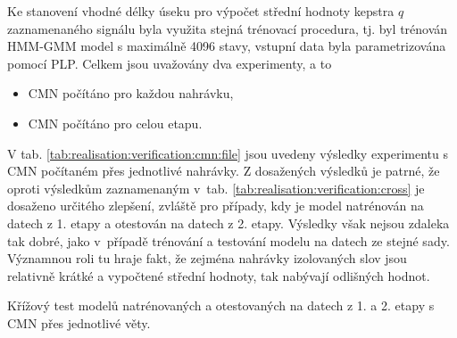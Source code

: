 Ke stanovení vhodné délky úseku pro výpočet střední hodnoty kepstra $q$ zaznamenaného signálu byla využita stejná trénovací procedura, tj. byl
trénován HMM-GMM model s maximálně 4096 stavy, vstupní data byla parametrizována pomocí PLP.
Celkem jsou uvažovány dva experimenty, a to

\begin{itemize}
  \item CMN počítáno pro každou nahrávku,
  \item CMN počítáno pro celou etapu.
\end{itemize}

V tab. \ref{tab:realisation:verification:cmn:file} jsou uvedeny výsledky experimentu s CMN počítaném přes jednotlivé nahrávky.
Z dosažených výsledků je patrné, že oproti výsledkům zaznamenaným v~tab. \ref{tab:realisation:verification:cross} je dosaženo určitého zlepšení, zvláště pro případy, kdy je model natrénován na datech z 1. etapy a otestován na datech z 2. etapy.
Výsledky však nejsou zdaleka tak dobré, jako v~případě trénování a testování modelu na datech ze stejné sady.
Významnou roli tu hraje fakt, že zejména nahrávky izolovaných slov jsou relativně krátké a vypočtené střední hodnoty, tak nabývají odlišných hodnot.

\begin{table}[htpb]
  \centering
  \def\arraystretch{1.5}
  \caption[Křížový test s CMN přes jednotlivé věty.]{Křížový test modelů natrénovaných a otestovaných na datech z 1. a 2. etapy s CMN  přes jednotlivé věty.}
  \label{tab:realisation:verification:cmn:file}
\end{table}

